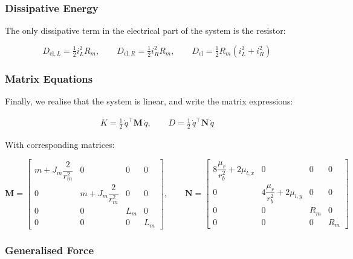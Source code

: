 \subsubsection*{Dissipative Energy}
The only dissipative term in the electrical part of the system is the resistor:

\begin{equation}
    D_{\mathrm{el},L} = \tfrac{1}{2} i_L^2 R_m, \qquad 
    D_{\mathrm{el},R} = \tfrac{1}{2} i_R^2 R_m, \qquad
    D_{\mathrm{el}} = \tfrac{1}{2} R_m \left(i_L^2 + i_R^2\right)
\end{equation}

\subsubsection*{Matrix Equations}
Finally, we realise that the system is linear, and write the matrix expressions:

\begin{equation}
  \begin{aligned}
    K = \tfrac{1}{2}\,\dot q^\top \mathbf{M}\,\dot q,
\qquad
D = \tfrac{1}{2}\,\dot q^\top \mathbf{N}\,\dot q
  \end{aligned}
\end{equation}

With corresponding matrices:

\begin{equation}
\mathbf{M} = \begin{bmatrix}
m + J_m \dfrac{2}{r_m^2} & 0 & 0 & 0 \\
0 & m + J_m \dfrac{2}{r_m^2} & 0 & 0 \\
0 & 0 & L_m & 0 \\
0 & 0 & 0 & L_m
\end{bmatrix}, \qquad
\mathbf{N} = \begin{bmatrix}
8\dfrac{\mu_r}{r_b^2} + 2\mu_{l,x} & 0 & 0 & 0 \\
0 & 4\dfrac{\mu_r}{r_b^2} + 2\mu_{l,y} & 0 & 0 \\
0 & 0 & R_m & 0 \\
0 & 0 & 0 & R_m
\end{bmatrix}
\end{equation}


\subsubsection{Generalised Force}

